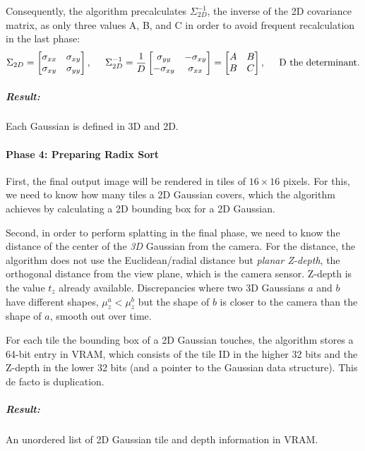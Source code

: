 Consequently, the algorithm precalculates $\Sigma_{2D}^{-1}$, the inverse of the 2D covariance matrix, as only three values A, B, and C in order to avoid frequent recalculation in the last phase:
$$
\Sigma_{2D} = 
\begin{bmatrix}
    \sigma_{xx} & \sigma_{xy} \\
    \sigma_{xy} & \sigma_{yy}
\end{bmatrix}, \hspace{0.5cm}
\Sigma_{2D}^{-1} =
\frac{1}{D} 
\begin{bmatrix} 
    \sigma_{yy} & -\sigma_{xy} \\
    -\sigma_{xy} & \sigma_{xx}
\end{bmatrix} = 
\begin{bmatrix}
    A & B \\ 
    B & C
\end{bmatrix}, \hspace{0.5cm}
\text{D the determinant.}
$$
\subparagraph{Result:} Each Gaussian is defined in 3D and 2D.

\paragraph{Phase 4: Preparing Radix Sort} First, the final output image will be rendered in tiles of $16\times 16$ pixels. For this, we need to know how many tiles a 2D Gaussian covers, which the algorithm achieves by calculating a 2D bounding box for a 2D Gaussian.

Second, in order to perform splatting in the final phase, we need to know the distance of the center of the \textit{3D} Gaussian from the camera. For the distance, the algorithm does not use the Euclidean/radial distance but \textit{planar Z-depth}, the orthogonal distance from the view plane, which is the camera sensor. Z-depth is the value $t_z$ already available. 
Discrepancies where two 3D Gaussians $a$ and $b$ have different shapes, $\mu_z^a < \mu_z^b$ but the shape of $b$ is closer to the camera than the shape of $a$, smooth out over time.

For each tile the bounding box of a 2D Gaussian touches, the algorithm stores a 64-bit entry in VRAM, which consists of the tile ID in the higher 32 bits and the Z-depth in the lower 32 bits (and a pointer to the Gaussian data structure). This de facto is duplication.
\subparagraph{Result:} An unordered list of 2D Gaussian tile and depth information in VRAM.

